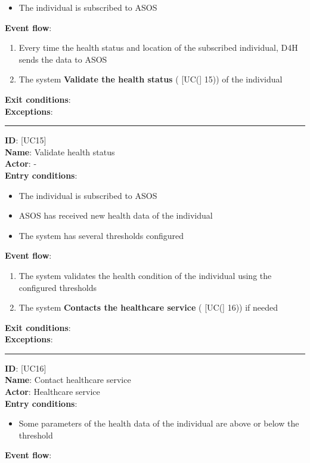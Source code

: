 \documentclass[12pt]{report}
\newcommand\usecase[1]{ [UC#1] }
\begin{document}
\begin{itemize}
\begin{itemize}
    			\item{The individual is subscribed to ASOS}
    		\end{itemize}
  	\textbf{Event flow}:
  		\begin{enumerate}
    			\item{Every time the health status and location of the subscribed individual, D4H sends the data to ASOS}
    			\item{The system \textbf{Validate the health status} (\usecase(15)) of the individual}
  		\end{enumerate}
  	\textbf{Exit conditions}: \\
  	\textbf{Exceptions}: \\
  	\rule{\linewidth}{0.4pt}
  	\textbf{ID}: \usecase{15} \\
  	\textbf{Name}: Validate health status \\
    \textbf{Actor}: - \\
    \textbf{Entry conditions}: 
    		\begin{itemize}
    			\item{The individual is subscribed to ASOS}
    			\item{ASOS has received new health data of the individual}
    			\item{The system has several thresholds configured}
    		\end{itemize}
  	\textbf{Event flow}:
  		\begin{enumerate}
    			\item{The system validates the health condition of the individual using the configured thresholds}
    			\item{The system \textbf{Contacts the healthcare service} (\usecase(16)) if needed}
  		\end{enumerate}
  	\textbf{Exit conditions}: \\
  	\textbf{Exceptions}: \\
  	\rule{\linewidth}{0.4pt}
  	\textbf{ID}: \usecase{16} \\
  	\textbf{Name}: Contact healthcare service \\
    \textbf{Actor}: Healthcare service \\
    \textbf{Entry conditions}: 
    		\begin{itemize}
    			\item{Some parameters of the health data of the individual are above or below the threshold}
    		\end{itemize}
  	\textbf{Event flow}:
  		\begin{enumerate}

\end{enumerate}
\end{itemize}
\end{document}
